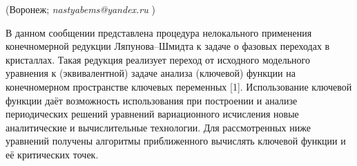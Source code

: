 

\vzmsinfo(Воронеж; {\it nastyabems@yandex.ru} )


В данном сообщении представлена процедура нелокального применения
конечномерной редукции Ляпунова--Шми\-д\-та к задаче о фазовых
переходах в кристаллах. Такая редукция реализует переход от
исходного модельного уравнения к (эквивалентной) задаче анализа
(ключевой) функции на конечномерном пространстве ключевых переменных
[1]. Использование ключевой функции даёт возможность использования
при построении и анализе периодических решений уравнений
вариационного исчисления новые аналитические и вычислительные
технологии. Для рассмотренных ниже уравнений получены алгоритмы
приближенного вычислять ключевой функции и её критических точек.


